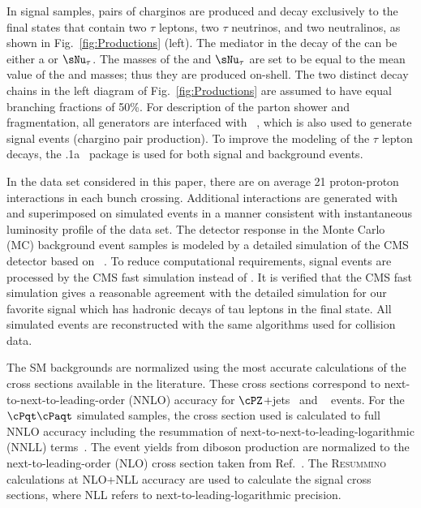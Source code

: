 In signal samples, pairs of charginos are produced and decay exclusively to the final states that contain 
two $\tau$ leptons, two $\tau$ neutrinos, and two neutralinos, as shown in Fig.~\ref{fig:Productions} (left). 
The mediator in the decay of the \chione can be either a \sTau or $\sNu_{\tau}$. 
The masses of the \sTau and $\sNu_{\tau}$ are set to be equal to the mean value of the \chione and \PSGczDo masses; thus they are produced on-shell.
The two distinct decay chains in the left diagram of Fig.~\ref{fig:Productions} 
are assumed to have equal branching fractions of 50\%. 
For description of the parton shower and fragmentation, all generators are interfaced with ~\cite{Sjostrand:2006za}, 
which is also used to generate signal events (chargino pair production). To improve the modeling of the $\tau$ lepton decays, 
 the .1a~\cite{Davidson:2010rw} package is used for both signal and background events. 


In the data set considered in this paper,
there are on average 21 proton-proton interactions in each bunch crossing.
Additional interactions are generated with \PYTHIA and superimposed on simulated events in a manner consistent with 
 instantaneous luminosity profile of the data set.
The detector response in the  Monte Carlo (MC) background event samples is modeled by a
detailed simulation
of the CMS detector based on {\GEANTfour}~\cite{Agostinelli:2002hh}.  
To reduce  computational requirements, signal events 
are processed by the CMS fast simulation \cite{Abdullin:2011zz} instead of {\GEANTfour}. 
It is verified that the CMS fast simulation gives a reasonable agreement with the detailed simulation for our favorite signal which has hadronic decays of 
tau leptons in the final state.
All simulated events are reconstructed with the same algorithms used for collision data.

The SM backgrounds are normalized using the most accurate calculations of the cross sections available 
in the literature. These cross sections correspond to next-to-next-to-leading-order (NNLO) accuracy for $\cPZ$+jets~\cite{Melnikov:2006kv} 
and \wjets~\cite{xsec_WZ} events. For the $\cPqt\cPaqt$ simulated samples, the cross section used is calculated to full NNLO accuracy including
the resummation of next-to-next-to-leading-logarithmic (NNLL) terms~\cite{Czakon:2011xx}. %
The event yields from diboson production are normalized to the next-to-leading-order (NLO) cross section  taken from Ref.~\cite{Campbell:2011bn}. 
The \textsc{Resummino}~\cite{Fuks:2012qx,Fuks:2013vua,Fuks:2013lya} calculations at NLO+NLL accuracy are used to calculate the signal cross sections, where 
NLL refers to next-to-leading-logarithmic precision.
